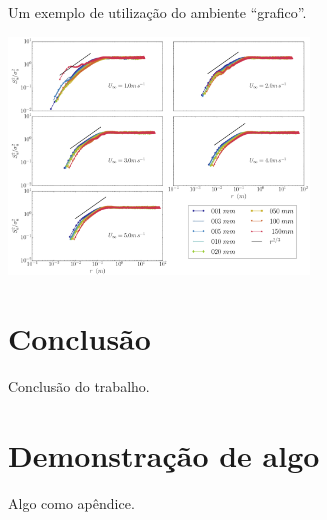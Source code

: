 \documentclass[oneside,openright,12pt]{ufsm_2021} %
\begin{document}
	\begin{grafico}[ht]
		\caption{\label{exepretex3}Um exemplo de utilização do ambiente ``grafico''.}
		\centering
		\includegraphics[width=0.6\textwidth]{figuras/estrutura_com.pdf}
	\end{grafico}
	
	\chapter{Conclusão}
	
	\par Conclusão do trabalho.
	\lipsum[1-5]
	
	
	
	
	
	
	
	
	\startbibliography %
	
	
	
	\apendice %
	
	\chapter{Demonstração de algo}
	\par Algo como apêndice.  
	\lipsum[2-10]
	
\end{document}
